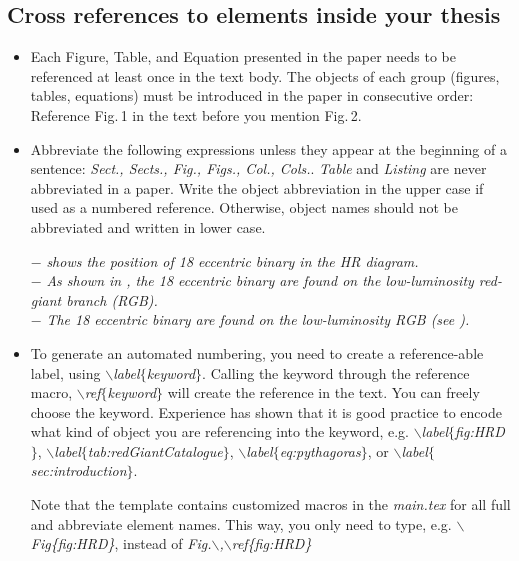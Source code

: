 \subsection*{Cross references to elements inside your thesis}
\begin{itemize}
    \item Each Figure, Table, and Equation presented in the paper needs to be referenced at least once in the text body. The objects of each group (figures, tables, equations) must be introduced in the paper in consecutive order: Reference Fig.\,1 in the text before you mention Fig.\,2.
    
    \item Abbreviate the following expressions unless they appear at the beginning of a sentence:  \textit{Sect., Sects., Fig., Figs., Col., Cols.}. \textit{Table} and \textit{Listing} are never abbreviated in a paper. Write the object abbreviation in the upper case if used as a numbered reference. Otherwise, object names should not be abbreviated and written in lower case.
    
    $-$ \textit{ shows the position of 18 eccentric binary in the HR diagram.}\\
    $-$ \textit{As shown in , the 18 eccentric binary are found on the low-luminosity red-giant branch (RGB).} \\
    $-$ \textit{The 18 eccentric binary are found on the low-luminosity RGB (see ).}
    
    \item To generate an automated numbering, you need to create a reference-able label, using \textit{$\backslash$label$\{$keyword$\}$}. Calling the keyword through the reference macro, \textit{$\backslash$ref$\{$keyword$\}$} will create the reference in the text. You can freely choose the keyword. Experience has shown that it is good practice to encode what kind of object you are referencing into the keyword, e.g.
    \textit{$\backslash$label$\{$fig:HRD$\}$}, 
    \textit{$\backslash$label$\{$tab:redGiantCatalogue$\}$}, 
    \textit{$\backslash$label$\{$eq:pythagoras$\}$}, or
    \textit{$\backslash$label$\{$sec:introduction$\}$}.

    Note that the template contains customized macros in the \textit{main.tex} for all full and abbreviate element names. This way, you only need to type, e.g. \textit{$\backslash$Fig\{fig:HRD\}}, instead of \textit{Fig.$\backslash$,$\backslash$ref\{fig:HRD\}}


\end{itemize}


